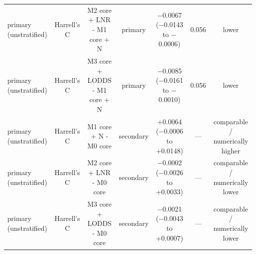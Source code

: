 \begin{table}[htbp]
{\begin{tabular}{@{}lcccccc@{}}
primary (unstratified) & Harrell's C & M2 core + LNR - M1 core + N & primary & $-$0.0067 ($-$0.0143 to $-$0.0006) & 0.056 & lower \\
primary (unstratified) & Harrell's C & M3 core + LODDS - M1 core + N & primary & $-$0.0085 ($-$0.0161 to $-$0.0010) & 0.056 & lower \\
primary (unstratified) & Harrell's C & M1 core + N - M0 core & secondary & +0.0064 ($-$0.0006 to +0.0148) & --- & comparable / numerically higher \\
primary (unstratified) & Harrell's C & M2 core + LNR - M0 core & secondary & $-$0.0002 ($-$0.0026 to +0.0033) & --- & comparable / numerically lower \\
primary (unstratified) & Harrell's C & M3 core + LODDS - M0 core & secondary & $-$0.0021 ($-$0.0043 to +0.0007) & --- & comparable / numerically lower \\
\bottomrule
\end{tabular}}
\smallskip{}
\end{table}
